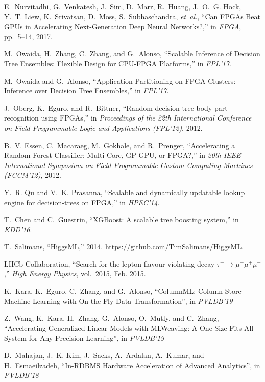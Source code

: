 \documentclass[11pt,dvipdfm]{article}
\begin{document}
\begin{thebibliography}{10}
\begin{small}
E.~Nurvitadhi, G.~Venkatesh, J.~Sim, D.~Marr, R.~Huang, J.~O.~G. Hock, Y.~T.
  Liew, K.~Srivatsan, D.~Moss, S.~Subhaschandra, {\em et~al.}, ``{Can FPGAs
  Beat GPUs in Accelerating Next-Generation Deep Neural Networks?},'' in {\em
  FPGA}, pp.~5--14, 2017.

M.~Owaida, H.~Zhang, C.~Zhang, and G.~Alonso, ``{Scalable Inference of Decision
  Tree Ensembles: Flexible Design for {CPU-FPGA} Platforms},'' in {\em FPL'17}.

M.~Owaida and G.~Alonso, ``{Application Partitioning on FPGA Clusters:
  Inference over Decision Tree Ensembles},'' in {\em FPL'17}.

J.~Oberg, K.~Eguro, and R.~Bittner, ``{Random decision tree body part
  recognition using {FPGAs}},'' in {\em Proceedings of the 22th International
  Conference on Field Programmable Logic and Applications (FPL'12)}, 2012.

B.~V. Essen, C.~Macaraeg, M.~Gokhale, and R.~Prenger, ``{Accelerating a Random
  Forest Classifier: Multi-Core, {GP-GPU}, or {FPGA}?},'' in {\em 20th IEEE
  International Symposium on Field-Programmable Custom Computing Machines
  (FCCM'12)}, 2012.

Y.~R. Qu and V.~K. Prasanna, ``{Scalable and dynamically updatable lookup
  engine for decision-trees on {FPGA}},'' in {\em HPEC'14}.

T.~Chen and C.~Guestrin, ``{XGBoost}: A scalable tree boosting system,'' in
  {\em KDD'16}.

T.~Salimans, ``{HiggsML},'' 2014.
\newblock \url{https://github.com/TimSalimans/HiggsML}.

{LHCb Collaboration}, ``{Search for the lepton flavour violating decay $\tau^-
  \to \mu^-\mu^+\mu^-$},'' {\em High Energy Physics}, vol.~2015, Feb. 2015.

{K.~Kara, K.~Eguro, C.~Zhang, and G.~Alonso}, ``ColumnML: Column Store Machine Learning with On-the-Fly Data Transformation'', in {\em PVLDB'19}

{Z.~Wang, K.~Kara, H.~Zhang, G.~Alonso, O.~Mutly, and C.~Zhang}, ``Accelerating Generalized Linear Models with MLWeaving: A One-Size-Fits-All System for Any-Precision Learning'', in {\em PVLDB'19}

{D.~Mahajan, J.~K. Kim, J.~Sacks, A.~Ardalan, A.~Kumar, and H.~Esmaeilzadeh},
``In-RDBMS Hardware Acceleration of Advanced Analytics'', in {\em PVLDB'18}


\end{small}
\end{thebibliography}
\end{document}
